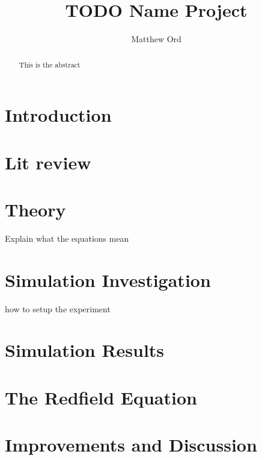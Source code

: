 \documentclass{article}
\title{TODO Name Project}
\author{Matthew Ord}
\date{}
\begin{document}
\maketitle

\begin{abstract}
    This is the abstract
\end{abstract}



\pagebreak
\section{Introduction}



\section{Lit review}

\section{Theory}\label{sec:the model}
Explain what the equations mean


\section{Simulation Investigation}\label{sec:simulation}
how to setup the experiment


\section{Simulation Results}\label{sec:simulation results}




\section{The Redfield Equation}\label{sec:redfield}


\section{Improvements and Discussion}

\end{document}
